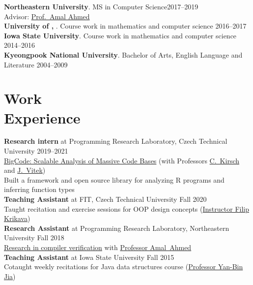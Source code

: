 \documentclass[margin,line]{resume}
\begin{document}
\begin{resume}
    \textbf{Northeastern University}. MS in Computer Science\hfill 2017--2019\\
    Advisor: \href{http://www.ccs.neu.edu/home/amal/}{Prof.~Amal Ahmed}\\[\mymedskip]
    \textbf{University of \Hawaii, \Manoa}. Course work in mathematics
    and computer science \hfill 2016--2017\\[\mymedskip]  %
    \textbf{Iowa State University}. Course work in mathematics and computer science \hfill 2014--2016\\[\mymedskip]
    \textbf{Kyeongpook National University}. Bachelor of Arts, English Language and Literature \hfill 2004--2009  %
    

    \section{\mysidestyle Work\\Experience}
    \textbf{Research intern} {\small at Programming Research Laboratory, Czech Technical University} \hfill 2019--2021\\
    \href{https://bigcode-prl-prg.github.io/}{BigCode: Scalable Analysis of Massive Code Bases} (with Professors \href{http://cs.uni-salzburg.at/~ck/}{C.~Kirsch} and \href{http://janvitek.org/}{J.~Vitek})\\
    Built a framework and open source library for analyzing R programs and inferring function types\\[\mymedskip]
    \textbf{Teaching Assistant} {\small at FIT, Czech Technical University} \hfill Fall 2020\\
    Taught recitation and exercise sessions for OOP design concepts (\href{https://fikovnik.net/}{Instructor Filip Krikava})\\[\mymedskip]
    \textbf{Research Assistant} {\small at Programming Research Laboratory, Northeastern University} \hfill Fall 2018\\
    \href{https://github.com/hyeyoungshin/popl19src}{Research in compiler verification}
    with \href{https://www.ccs.neu.edu/home/amal/}{Professor Amal~Ahmed}\\[\mymedskip]
    \textbf{Teaching Assistant} {\small at Iowa State University} \hfill Fall 2015\\
    Cotaught weekly recitations for Java data structures course (\href{http://web.cs.iastate.edu/~jia/}{Professor Yan-Bin Jia})
    


\end{resume}
\end{document}
